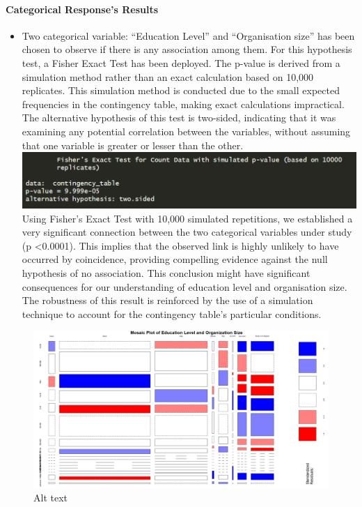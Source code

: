 \documentclass[
  12pt,
]{article}
\providecommand{\tightlist}{%
  \setlength{\itemsep}{0pt}\setlength{\parskip}{0pt}}
\begin{document}
\hypertarget{categorical-responses-results}{%
\paragraph{Categorical Response's
Results}\label{categorical-responses-results}}

\begin{itemize}
\tightlist
\item
  Two categorical variable: ``Education Level'' and ``Organisation
  size'' has been chosen to observe if there is any association among
  them. For this hypothesis test, a Fisher Exact Test has been deployed.
  The p-value is derived from a simulation method rather than an exact
  calculation based on 10,000 replicates. This simulation method is
  conducted due to the small expected frequencies in the contingency
  table, making exact calculations impractical. The alternative
  hypothesis of this test is two-sided, indicating that it was examining
  any potential correlation between the variables, without assuming that
  one variable is greater or lesser than the other.
  \includegraphics[width=1\textwidth,height=1\textheight]{fisher-test-result.png}
  Using Fisher's Exact Test with 10,000 simulated repetitions, we
  established a very significant connection between the two categorical
  variables under study (p \textless0.0001). This implies that the
  observed link is highly unlikely to have occurred by coincidence,
  providing compelling evidence against the null hypothesis of no
  association. This conclusion might have significant consequences for
  our understanding of education level and organisation size. The
  robustness of this result is reinforced by the use of a simulation
  technique to account for the contingency table's particular
  conditions.
\end{itemize}

\begin{figure}
\centering
\includegraphics[width=1\textwidth,height=1\textheight]{mosaic-fisher-plot.png}
\caption{Alt text}
\end{figure}
\end{document}

